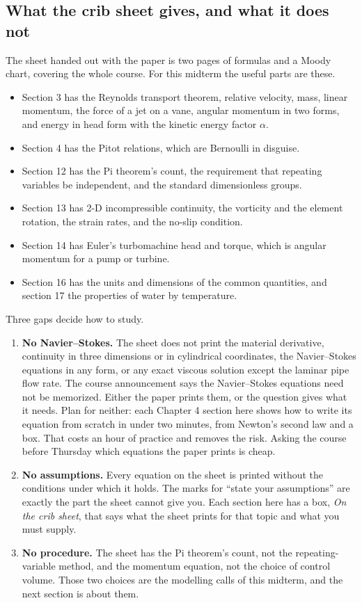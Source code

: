 \subsection*{What the crib sheet gives, and what it does not}

The sheet handed out with the paper is two pages of formulas and a Moody chart, covering the whole course. For this midterm the useful parts are these.

\begin{itemize}[nosep,leftmargin=*]
\item Section 3 has the Reynolds transport theorem, relative velocity, mass, linear momentum, the force of a jet on a vane, angular momentum in two forms, and energy in head form with the kinetic energy factor $\alpha$.
\item Section 4 has the Pitot relations, which are Bernoulli in disguise.
\item Section 12 has the Pi theorem's count, the requirement that repeating variables be independent, and the standard dimensionless groups.
\item Section 13 has 2-D incompressible continuity, the vorticity and the element rotation, the strain rates, and the no-slip condition.
\item Section 14 has Euler's turbomachine head and torque, which is angular momentum for a pump or turbine.
\item Section 16 has the units and dimensions of the common quantities, and section 17 the properties of water by temperature.
\end{itemize}

Three gaps decide how to study.

\begin{enumerate}[nosep,leftmargin=*]
\item \textbf{No Navier--Stokes.} The sheet does not print the material derivative, continuity in three dimensions or in cylindrical coordinates, the Navier--Stokes equations in any form, or any exact viscous solution except the laminar pipe flow rate. The course announcement says the Navier--Stokes equations need not be memorized. Either the paper prints them, or the question gives what it needs. Plan for neither: each Chapter 4 section here shows how to write its equation from scratch in under two minutes, from Newton's second law and a box. That costs an hour of practice and removes the risk. Asking the course before Thursday which equations the paper prints is cheap.
\item \textbf{No assumptions.} Every equation on the sheet is printed without the conditions under which it holds. The marks for ``state your assumptions'' are exactly the part the sheet cannot give you. Each section here has a box, \emph{On the crib sheet}, that says what the sheet prints for that topic and what you must supply.
\item \textbf{No procedure.} The sheet has the Pi theorem's count, not the repeating-variable method, and the momentum equation, not the choice of control volume. Those two choices are the modelling calls of this midterm, and the next section is about them.
\end{enumerate}


